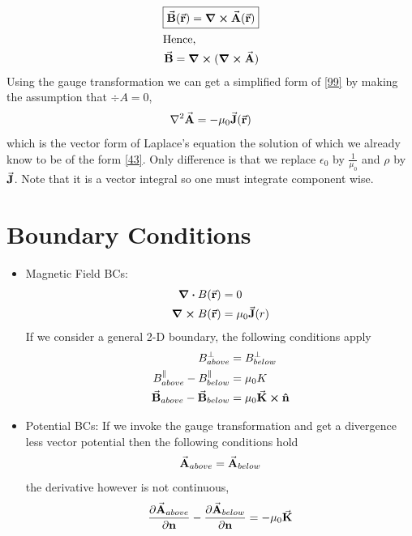 \documentclass[12pt, oneside]{book}
\begin{document}
\begin{align}
	\boxed{\va{B}(\va{r})=\curl{\va{A}(\va{r})}} \\
	\intertext{Hence,}
	\va{B}=\curl{(\curl{\va{A}})}\label{99}
\end{align}
Using the gauge transformation we can get a simplified form of \eqref{99} by making the assumption that $\div{A}=0$,
\begin{equation*}
	\laplacian{\va{A}}=-\mu_0\va{J}(\va{r})
\end{equation*}
which is the vector form of Laplace's equation the solution of which we already know to be of the form
\eqref{43}. Only difference is that we replace $\epsilon_0$ by $\tfrac{1}{\mu_0}$ and $\rho$ by $\va{J}$. Note that it is a vector integral so one must integrate component wise. 

\section{Boundary Conditions}
\begin{tcolorbox}[colback=yellow!5!white,colframe=yellow!50!black]
	\begin{itemize}
	\item Magnetic Field BCs:	\begin{align}
			\div{B}(\va{r})&=0 \\
			\curl{B}(\va{r})&=\mu_0 \va{J}(r)
		\end{align}
		If we consider a general 2-D boundary, the following conditions apply
		\begin{align}
			B_{above}^{\perp}&=B_{below}^{\perp} \\
			B_{above}^{\parallel}-B_{below}^{\parallel}&=\mu_0 K \\
			\va{B}_{above}-\va{B}_{below}&=\mu_0 \va{K}\cross \vu{n}
		\end{align}
	\item Potential BCs:
	If we invoke the gauge transformation and get a divergence less vector potential then the following conditions hold
	\begin{equation}
			\va{A}_{above}=\va{A}_{below}  
	\end{equation}
the derivative however is not continuous,
	\begin{equation}
		\pdv{\va{A}_{above}}{\textbf{n}}-\pdv{\va{A}_{below}}{\textbf{n}}=-\mu_0 \va{K}
	\end{equation}
	\end{itemize}
\end{tcolorbox}
\end{document}

